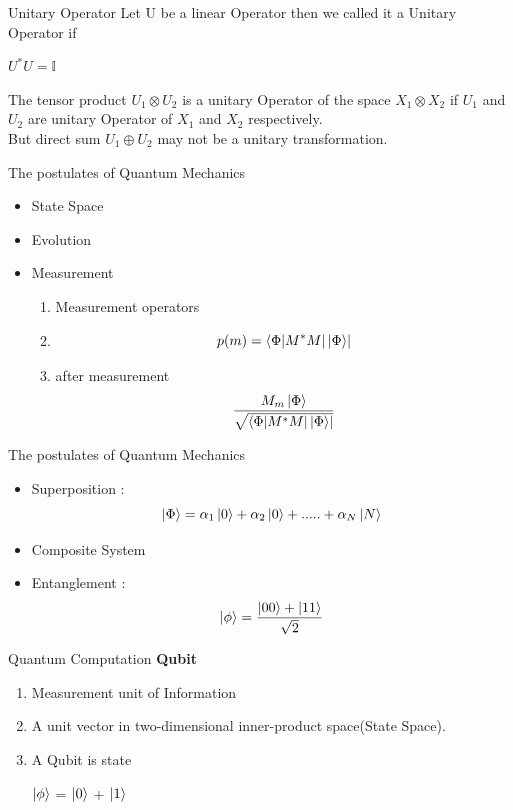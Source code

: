 \documentclass[xcolor=svgnames]{beamer}
\newcommand{\tens}[1]{
  \mathbin{\mathop{\otimes}\limits_{#1}}}
\begin{document}
\begin{frame}{Unitary Operator}
Let U be a linear Operator then we called it a Unitary Operator if
\begin{center}
$U^{*}U=\mathbb{I}$
\end{center}
The tensor product $U_1 \tens{} U_2$ is a unitary Operator of the space $X_1 \tens{} X_2$ if $U_1$ and $U_2$ are unitary Operator of $X_1$ and $X_2$ respectively.\\
\vspace{0.5cm}
But direct sum $U_1 \oplus U_2 $ may not be a unitary transformation.
\end{frame}


\begin{frame}{The postulates of Quantum Mechanics}
\begin{itemize}
    \item State Space
    \item Evolution 
    \item Measurement
    \begin{enumerate}
        \item Measurement operators
        \item $$p(m) = \bra{\Phi|M^{*}M|\ket{\Phi}}$$
        \item after measurement $$ \dfrac{M_m \ket{\Phi}}{\sqrt{\bra{\Phi|M^{*}M|\ket{\Phi}}}}$$
    \end{enumerate}
\end{itemize}
\end{frame}

\begin{frame}{The postulates of Quantum Mechanics}
\begin{itemize}
    \item Superposition : $$\ket{\Phi} = \alpha_1\ket{0} + \alpha_2\ket{0}+ ..... +\alpha_N\ket{N} $$
    \item Composite System
    \item Entanglement : $$\ket{\phi} = \dfrac{\ket{00} + \ket{11}}{\sqrt{2}}$$
\end{itemize}
\end{frame}


\begin{frame}{Quantum Computation}
\textbf{Qubit}
\begin{enumerate}
    \item Measurement unit of Information
    \item A unit vector in two-dimensional inner-product space(State Space).
    \item A Qubit is state 
\begin{center}
 $\ket{\phi}$ = \alpha$\ket{0}$ + \beta$\ket{1}$
\end{center}
\end{enumerate}
\end{frame}
\end{document}
